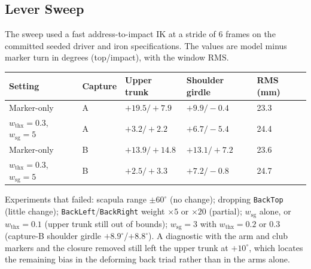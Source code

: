 \documentclass[11pt,a4paper]{article}
\begin{document}
\subsection{Lever Sweep}
The sweep used a fast address-to-impact IK at a stride of 6 frames on the committed seeded driver and iron specifications. The values are model minus marker turn in degrees (top/impact), with the window RMS.
\begin{center}
\begin{tabular}{lllll}
\hline
Setting & Capture & Upper trunk & Shoulder girdle & RMS (mm) \\
\hline
Marker-only & A & $+19.5/+7.9$ & $+9.9/-0.4$ & 23.3 \\
$w_{\mathrm{thx}}=0.3$, $w_{\mathrm{sg}}=5$ & A & $+3.2/+2.2$ & $+6.7/-5.4$ & 24.4 \\
Marker-only & B & $+13.9/+14.8$ & $+13.1/+7.2$ & 23.6 \\
$w_{\mathrm{thx}}=0.3$, $w_{\mathrm{sg}}=5$ & B & $+2.5/+3.3$ & $+7.2/-0.8$ & 24.7 \\
\hline
\end{tabular}
\end{center}
Experiments that failed: scapula range $\pm60^\circ$ (no change); dropping \texttt{BackTop} (little change); \texttt{BackLeft}/\texttt{BackRight} weight $\times5$ or $\times20$ (partial); $w_{\mathrm{sg}}$ alone, or $w_{\mathrm{thx}}=0.1$ (upper trunk still out of bounds); $w_{\mathrm{sg}}=3$ with $w_{\mathrm{thx}}=0.2$ or $0.3$ (capture-B shoulder girdle $+8.9^\circ$/$+8.8^\circ$). A diagnostic with the arm and club markers and the closure removed still left the upper trunk at $+10^\circ$, which locates the remaining bias in the deforming back triad rather than in the arms alone.
\end{document}

